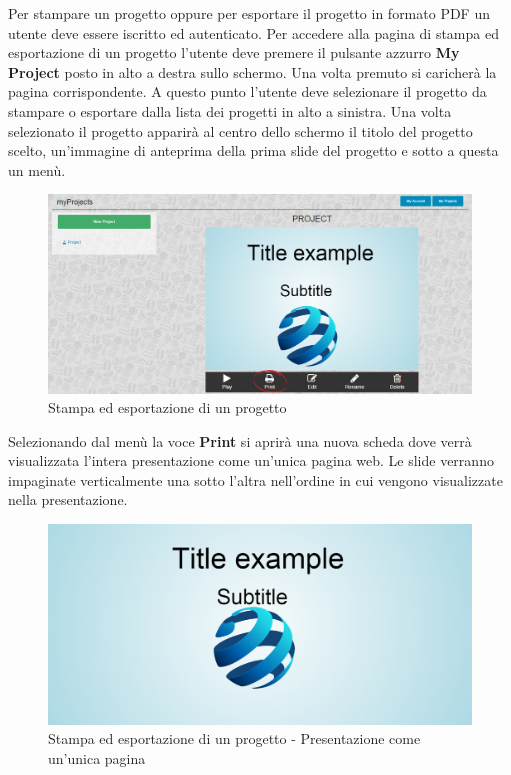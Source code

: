 Per stampare un progetto oppure per esportare il progetto in formato PDF un utente deve essere iscritto ed autenticato. Per accedere alla pagina di stampa ed esportazione di un progetto l'utente deve premere il pulsante azzurro \textbf{My Project} posto in alto a destra sullo schermo. Una volta premuto si caricherà la pagina corrispondente. A questo punto l'utente deve selezionare il progetto da stampare o esportare dalla lista dei progetti in alto a sinistra.
Una volta selezionato il progetto apparirà al centro dello schermo il titolo del progetto scelto, un'immagine di anteprima della prima slide del progetto e sotto a questa un menù. 

\begin{figure}[H] 
	\centering 
	\includegraphics[scale=0.40] {img/stampa_pro.png}
	\caption{Stampa ed esportazione di un progetto} 
\end{figure}

\noindent Selezionando dal menù la voce \textbf{Print} si aprirà una nuova scheda dove verrà visualizzata l'intera presentazione come un'unica pagina web. Le slide verranno impaginate verticalmente una sotto l'altra nell'ordine in cui vengono visualizzate nella presentazione.

\begin{figure}[H] 
	\centering 
	\includegraphics[scale=0.40] {img/print.png}
	\caption{Stampa ed esportazione di un progetto - Presentazione come un'unica pagina} 
\end{figure}

